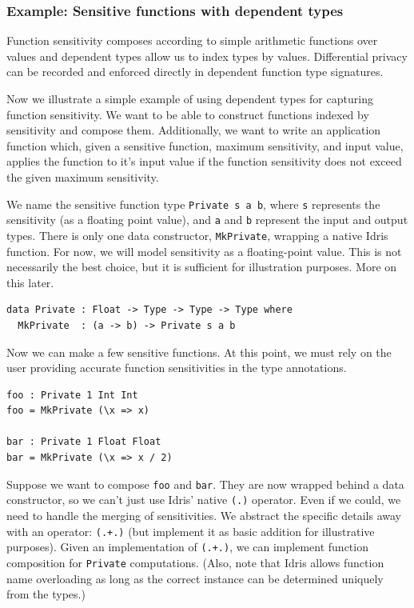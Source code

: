 \documentclass[12pt]{article}
\begin{document}
\subsubsection{Example: Sensitive functions with dependent types}

Function sensitivity composes according to simple arithmetic functions over values and dependent types allow us to index types by values.
Differential privacy can be recorded and enforced directly in dependent function type signatures.

Now we illustrate a simple example of using dependent types for capturing function sensitivity.
We want to be able to construct functions indexed by sensitivity and compose them.
Additionally, we want to write an application function which, given a sensitive function, maximum sensitivity, and input value, applies the function to it's input value if the function sensitivity does not exceed the given maximum sensitivity.

We name the sensitive function type \texttt{Private s a b}, where \texttt{s} represents the sensitivity (as a floating point value), and \texttt{a} and \texttt{b} represent the input and output types.
There is only one data constructor, \texttt{MkPrivate}, wrapping a native Idris function.
For now, we will model sensitivity as a floating-point value.
This is not necessarily the best choice, but it is sufficient for illustration purposes.
More on this later.

\begin{lstlisting}[caption="Sensitive functions in Idris"]
data Private : Float -> Type -> Type -> Type where
  MkPrivate  : (a -> b) -> Private s a b
\end{lstlisting}

Now we can make a few sensitive functions.
At this point, we must rely on the user providing accurate function sensitivities in the type annotations.

\begin{lstlisting}[caption="Simple examples of sensitive functions"]
foo : Private 1 Int Int
foo = MkPrivate (\x => x)

bar : Private 1 Float Float
bar = MkPrivate (\x => x / 2)
\end{lstlisting}

Suppose we want to compose \texttt{foo} and \texttt{bar}.
They are now wrapped behind a data constructor, so we can't just use Idris' native \texttt{(.)} operator.
Even if we could, we need to handle the merging of sensitivities.
We abstract the specific details away with an operator: \texttt{(.+.)} (but implement it as basic addition for illustrative purposes).
Given an implementation of \texttt{(.+.)}, we can implement function composition for \texttt{Private} computations.
(Also, note that Idris allows function name overloading as long as the correct instance can be determined uniquely from the types.)
\end{document}
